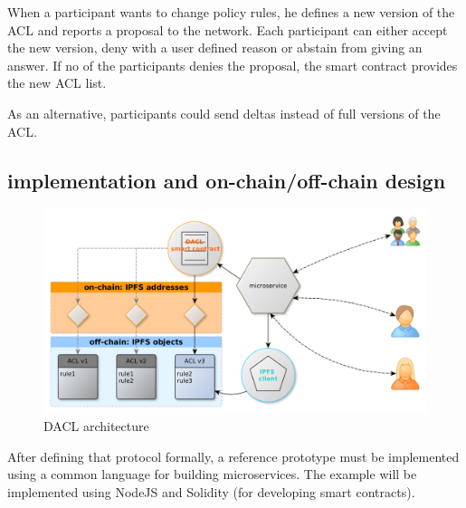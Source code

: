 \documentclass[12pt, conference]{IEEEtran}
\begin{document}
%
%
%

When a participant wants to change policy rules, he defines a new version of the ACL and reports a proposal to the network. Each participant can either accept the new version, deny with a user defined reason or abstain from giving an answer. If no of the participants denies the proposal, the smart contract provides the new ACL list. 

As an alternative, participants could send deltas instead of full versions of the ACL.\\


\subsection{implementation and on-chain/off-chain design}

\begin{figure}[!h]
  \centering
  \includegraphics[width=\linewidth]{figures/eth-ipfs-design-without-client.png}
  \caption{DACL architecture}
  \label{fig:ipfs-design-without-client}
  \centering
\end{figure}

After defining that protocol formally, a reference prototype must be implemented using a common language for building microservices. The example will be implemented using NodeJS and Solidity (for developing smart contracts). 
\end{document}
